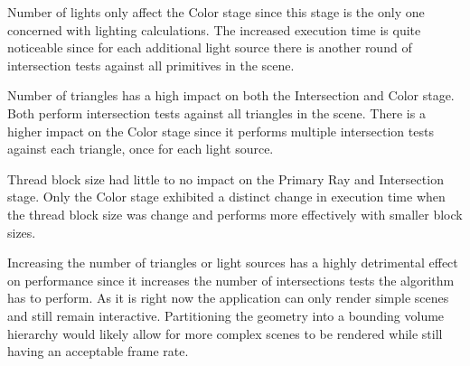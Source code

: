 \documentclass{article}
\begin{document}
Number of lights only affect the Color stage since this stage is the only one concerned with lighting calculations. The
increased execution time is quite noticeable since for each additional light source there is another round of intersection
tests against all primitives in the scene.

Number of triangles has a high impact on both the Intersection and Color stage. Both perform intersection tests against all
triangles in the scene. There is a higher impact on the Color stage since it performs multiple intersection tests against
each triangle, once for each light source.

Thread block size had little to no impact on the Primary Ray and Intersection stage. Only the Color stage exhibited a distinct
change in execution time when the thread block size was change and performs more effectively with smaller block sizes.

Increasing the number of triangles or light sources has a highly detrimental effect on performance since it increases the
number of intersections tests the algorithm has to perform. As it is right now the application can only render simple scenes
and still remain interactive. Partitioning the geometry into a bounding volume hierarchy would likely allow for more complex scenes
to be rendered while still having an acceptable frame rate.

%




\end{document}
